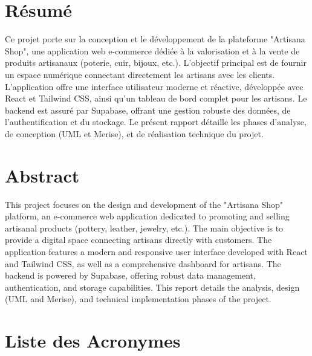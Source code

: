 \documentclass[12pt,a4paper]{report}
\begin{document}
\chapter*{Résumé}
Ce projet porte sur la conception et le développement de la plateforme "Artisana Shop", une application web e-commerce dédiée à la valorisation et à la vente de produits artisanaux (poterie, cuir, bijoux, etc.). L'objectif principal est de fournir un espace numérique connectant directement les artisans avec les clients. L'application offre une interface utilisateur moderne et réactive, développée avec React et Tailwind CSS, ainsi qu'un tableau de bord complet pour les artisans. Le backend est assuré par Supabase, offrant une gestion robuste des données, de l'authentification et du stockage. Le présent rapport détaille les phases d'analyse, de conception (UML et Merise), et de réalisation technique du projet.

\chapter*{Abstract}
This project focuses on the design and development of the "Artisana Shop" platform, an e-commerce web application dedicated to promoting and selling artisanal products (pottery, leather, jewelry, etc.). The main objective is to provide a digital space connecting artisans directly with customers. The application features a modern and responsive user interface developed with React and Tailwind CSS, as well as a comprehensive dashboard for artisans. The backend is powered by Supabase, offering robust data management, authentication, and storage capabilities. This report details the analysis, design (UML and Merise), and technical implementation phases of the project.

\listoffigures
{}

\listoftables
{}

\chapter*{Liste des Acronymes}
\begin{acronym}
\end{acronym}
\end{document}
